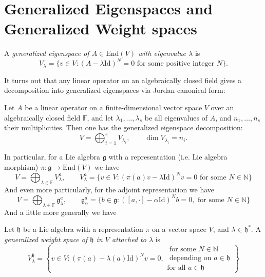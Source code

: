 \section{Generalized Eigenspaces and
Generalized Weight spaces}
\label{section-gener-eigen-gener-weigh}

\begin{definition}
\label{definition-generalized-eigenspace}
A {\it generalized eigenspace of $A \in
\text{End}(V)$
with eigenvalue $\lambda$} is
$$
V_\lambda=\{v \in V:(A-\lambda \text{Id})^N=0
\text{ for some positive integer }N\}.
$$
\end{definition}

It turns out that any linear operator on an
algebraically closed field gives a
decomposition into generalized eigenspaces
via Jordan canonical form:

\begin{proposition}
\label{proposition-gener-eigen-decom}
Let $A$ be a linear operator on a
finite-dimensional
vector space $V$ over an algebraically closed
field $\mathbb{F}$, and let
$\lambda_1,\ldots,\lambda_s$
be all eigenvalues of $A$, and
$n_1,\ldots,n_s$ their
multiplicities.
Then one has the generalized eigenspace
decomposition:
$$
V=\bigoplus_{i=1}^s V_{\lambda_i},\qquad \dim
V_{\lambda_i}=n_i.
$$
\end{proposition}

In particular, for a Lie algebra
$\mathfrak{g}$ with a
representation
(i.e. Lie algebra morphism)
$\pi:\mathfrak{g} \to \text{End}(V)$ we have
$$
V=\bigoplus_{\lambda \in
\mathbb{F}}V^a_\lambda,\qquad
V^a_\lambda=\{v \in V:(\pi(a)v-\lambda
\text{Id})^Nv=0\text{ for some }
N \in \mathbb{N}\}
$$
And even more particularly, for the adjoint
representation we have
$$
V=\bigoplus_{\lambda \in
\mathbb{F}}\mathfrak{g}^a_\lambda,\qquad
\mathfrak{g}_\alpha^a=\{b \in
\mathfrak{g}:([a,\cdot]-\alpha
\text{Id})^Nb=0,
\text{ for some }N \in \mathbb{N}\}
$$
And a little more generally we have
\begin{definition}
\label{definition-generalized-weight-space}
Let $\mathfrak{h}$ be a Lie algebra with a
representation $\pi$ on a vector
space $V$, and $\lambda \in \mathfrak{h}^*$.
A {\it generalized weight space of
$\mathfrak{h}$ in $V$ attached to $\lambda$}
is
$$
V_\lambda^\mathfrak{h}=
\left\{v \in V:
(\pi(a)-\lambda(a)\text{Id})^Nv=0,
\substack{ \text{ for some }N \in
\mathbb{N}\\
\text{ depending on }a \in \mathfrak{h}\\
\text{for all }a \in \mathfrak{h}}\right\}
$$
\end{definition}

